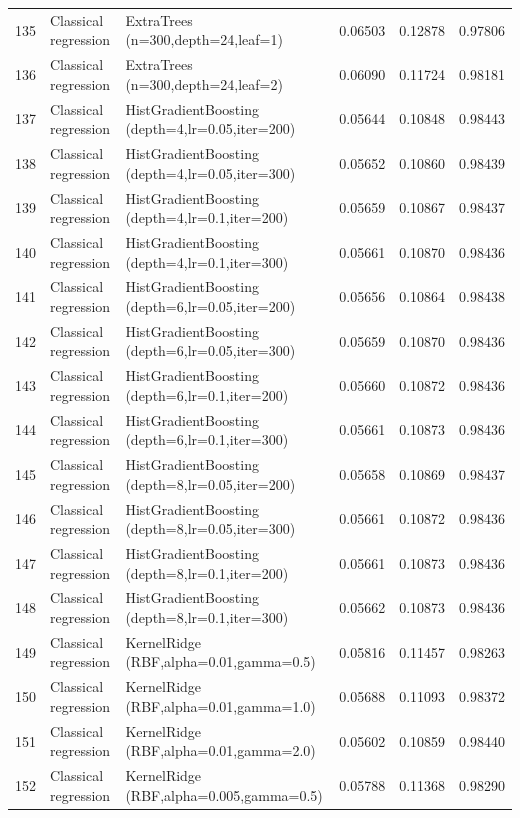 \documentclass[10pt]{article}
\begin{document}
\begin{longtable}{C{0.75cm}L{2.35cm}L{8.0cm}C{1.15cm}C{1.15cm}C{1.15cm}}
135 & Classical regression & ExtraTrees (n=300,depth=24,leaf=1) & 0.06503 & 0.12878 & 0.97806 \\
136 & Classical regression & ExtraTrees (n=300,depth=24,leaf=2) & 0.06090 & 0.11724 & 0.98181 \\
137 & Classical regression & HistGradientBoosting (depth=4,lr=0.05,iter=200) & 0.05644 & 0.10848 & 0.98443 \\
138 & Classical regression & HistGradientBoosting (depth=4,lr=0.05,iter=300) & 0.05652 & 0.10860 & 0.98439 \\
139 & Classical regression & HistGradientBoosting (depth=4,lr=0.1,iter=200) & 0.05659 & 0.10867 & 0.98437 \\
140 & Classical regression & HistGradientBoosting (depth=4,lr=0.1,iter=300) & 0.05661 & 0.10870 & 0.98436 \\
141 & Classical regression & HistGradientBoosting (depth=6,lr=0.05,iter=200) & 0.05656 & 0.10864 & 0.98438 \\
142 & Classical regression & HistGradientBoosting (depth=6,lr=0.05,iter=300) & 0.05659 & 0.10870 & 0.98436 \\
143 & Classical regression & HistGradientBoosting (depth=6,lr=0.1,iter=200) & 0.05660 & 0.10872 & 0.98436 \\
144 & Classical regression & HistGradientBoosting (depth=6,lr=0.1,iter=300) & 0.05661 & 0.10873 & 0.98436 \\
145 & Classical regression & HistGradientBoosting (depth=8,lr=0.05,iter=200) & 0.05658 & 0.10869 & 0.98437 \\
146 & Classical regression & HistGradientBoosting (depth=8,lr=0.05,iter=300) & 0.05661 & 0.10872 & 0.98436 \\
147 & Classical regression & HistGradientBoosting (depth=8,lr=0.1,iter=200) & 0.05661 & 0.10873 & 0.98436 \\
148 & Classical regression & HistGradientBoosting (depth=8,lr=0.1,iter=300) & 0.05662 & 0.10873 & 0.98436 \\
149 & Classical regression & KernelRidge (RBF,alpha=0.01,gamma=0.5) & 0.05816 & 0.11457 & 0.98263 \\
150 & Classical regression & KernelRidge (RBF,alpha=0.01,gamma=1.0) & 0.05688 & 0.11093 & 0.98372 \\
151 & Classical regression & KernelRidge (RBF,alpha=0.01,gamma=2.0) & 0.05602 & 0.10859 & 0.98440 \\
152 & Classical regression & KernelRidge (RBF,alpha=0.005,gamma=0.5) & 0.05788 & 0.11368 & 0.98290 \\

\end{longtable}
\end{document}
